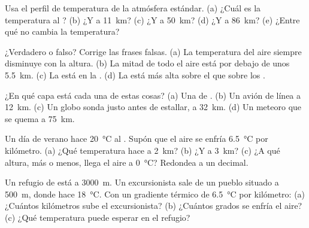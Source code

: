 \begin{exercise}[$\star$]\label{exo:g8:the-atmosphere:2}
Usa el perfil de temperatura de la atmósfera estándar. (a) ¿Cuál es la
temperatura al ? (b) ¿Y a \qty{11}{km}? (c) ¿Y a \qty{50}{km}?
(d) ¿Y a \qty{86}{km}? (e) ¿Entre qué  no cambia la temperatura?
\end{exercise}

\begin{exercise}[$\star$]\label{exo:g8:the-atmosphere:3}
¿Verdadero o falso? Corrige las frases falsas. (a) La temperatura del aire
siempre disminuye con la altura. (b) La mitad de todo el aire está por
debajo de unos \qty{5.5}{km}. (c) La  está en la .
(d) La  está más alta sobre el  que sobre los .
\end{exercise}

\begin{exercise}[$\star$]\label{exo:g8:the-atmosphere:4}
¿En qué capa está cada una de estas cosas? (a) Una  de . (b) Un
avión de línea a \qty{12}{km}. (c) Un globo sonda justo antes de estallar,
a \qty{32}{km}. (d) Un meteoro que se quema a \qty{75}{km}.
\end{exercise}

\begin{exercise}[$\star\star$]\label{exo:g8:the-atmosphere:5}
Un día de verano hace \qty{20}{\degreeCelsius} al . Supón que
el aire se enfría \qty{6.5}{\degreeCelsius} por kilómetro. (a) ¿Qué
temperatura hace a \qty{2}{km}? (b) ¿Y a \qty{3}{km}? (c) ¿A qué altura,
más o menos, llega el aire a \qty{0}{\degreeCelsius}? Redondea a un
decimal.
\end{exercise}

\begin{exercise}[$\star\star$]\label{exo:g8:the-atmosphere:6}
Un refugio de  está a \qty{3000}{m}. Un excursionista sale de un
pueblo situado a \qty{500}{m}, donde hace \qty{18}{\degreeCelsius}. Con un
gradiente térmico de \qty{6.5}{\degreeCelsius} por kilómetro: (a) ¿Cuántos
kilómetros sube el excursionista? (b) ¿Cuántos grados se enfría el aire?
(c) ¿Qué temperatura puede esperar en el refugio?
\end{exercise}

